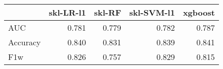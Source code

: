 \begin{tabular}{lrrrr}
\toprule
{} &  skl-LR-l1 &  skl-RF &  skl-SVM-l1 &  xgboost \\
\midrule
AUC      &      0.781 &   0.779 &       0.782 &    0.787 \\
Accuracy &      0.840 &   0.831 &       0.839 &    0.841 \\
F1w      &      0.826 &   0.757 &       0.829 &    0.815 \\
\bottomrule
\end{tabular}

